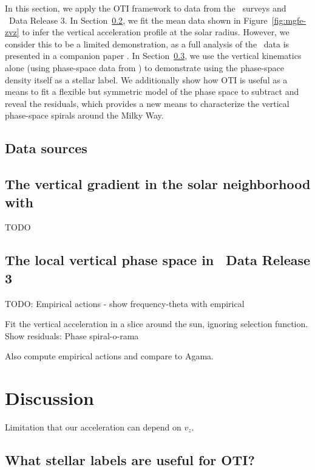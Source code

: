 In this section, we apply the OTI framework to data from the \apogee\ surveys and \gaia\
Data Release 3.
In Section~\ref{sec:apogee}, we fit the mean  data shown in
Figure~\ref{fig:mgfe-zvz} to infer the vertical acceleration profile at the solar
radius.
However, we consider this to be a limited demonstration, as a full analysis of the
\apogee\ data is presented in a companion paper \citep{Horta:2023}.
In Section~\ref{sec:gaiadr3}, we use the vertical kinematics alone (using phase-space
data from \gaia) to demonstrate using the phase-space density itself as a stellar label.
We additionally show how OTI is useful as a means to fit a flexible but symmetric model
of the phase space to subtract and reveal the residuals, which provides a new means to
characterize the vertical phase-space spirals around the Milky Way.

\subsection{Data sources} \label{sec:data}



\subsection{The vertical  gradient in the solar neighborhood with \apogee}
\label{sec:apogee}

TODO


\subsection{The local vertical phase space in \gaia\ Data Release 3}
\label{sec:gaiadr3}

TODO: Empirical actions - show frequency-theta with empirical

Fit the vertical acceleration in a slice around the sun, ignoring selection function.
Show residuals: Phase spiral-o-rama

Also compute empirical actions and compare to Agama.


\section{Discussion} \label{sec:discussion}

Limitation that our acceleration can depend on $v_z$.


\subsection{What stellar labels are useful for OTI?}

